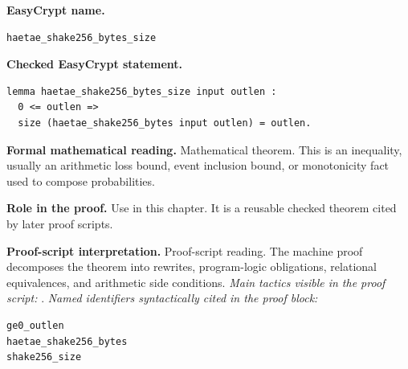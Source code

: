\begin{formaltheorem}
\noindent\textbf{EasyCrypt name.}
\begin{lstlisting}[language=EasyCrypt,basicstyle=\ttfamily\scriptsize]
haetae_shake256_bytes_size
\end{lstlisting}
\noindent\textbf{Checked EasyCrypt statement.}
\begin{lstlisting}[language=EasyCrypt,basicstyle=\ttfamily\scriptsize]
lemma haetae_shake256_bytes_size input outlen :
  0 <= outlen =>
  size (haetae_shake256_bytes input outlen) = outlen.
\end{lstlisting}
\noindent\textbf{Formal mathematical reading.}
Mathematical theorem. This is an inequality, usually an arithmetic loss bound, event inclusion bound, or monotonicity fact used to compose probabilities.

\noindent\textbf{Role in the proof.}
Use in this chapter. It is a reusable checked theorem cited by later proof scripts.

\noindent\textbf{Proof-script interpretation.}
Proof-script reading. The machine proof decomposes the theorem into rewrites, program-logic obligations, relational equivalences, and arithmetic side conditions.
\emph{Main tactics visible in the proof script:} .
\emph{Named identifiers syntactically cited in the proof block:}
\begin{lstlisting}[language=EasyCrypt,basicstyle=\ttfamily\scriptsize]
ge0_outlen
haetae_shake256_bytes
shake256_size
\end{lstlisting}

\end{formaltheorem}

